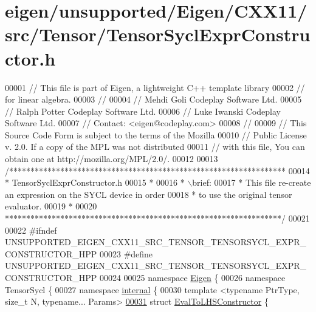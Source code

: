 \hypertarget{eigen_2unsupported_2_eigen_2_c_x_x11_2src_2_tensor_2_tensor_sycl_expr_constructor_8h_source}{}\section{eigen/unsupported/\+Eigen/\+C\+X\+X11/src/\+Tensor/\+Tensor\+Sycl\+Expr\+Constructor.h}
\label{eigen_2unsupported_2_eigen_2_c_x_x11_2src_2_tensor_2_tensor_sycl_expr_constructor_8h_source}

\begin{DoxyCode}
00001 \textcolor{comment}{// This file is part of Eigen, a lightweight C++ template library}
00002 \textcolor{comment}{// for linear algebra.}
00003 \textcolor{comment}{//}
00004 \textcolor{comment}{// Mehdi Goli    Codeplay Software Ltd.}
00005 \textcolor{comment}{// Ralph Potter  Codeplay Software Ltd.}
00006 \textcolor{comment}{// Luke Iwanski  Codeplay Software Ltd.}
00007 \textcolor{comment}{// Contact: <eigen@codeplay.com>}
00008 \textcolor{comment}{//}
00009 \textcolor{comment}{// This Source Code Form is subject to the terms of the Mozilla}
00010 \textcolor{comment}{// Public License v. 2.0. If a copy of the MPL was not distributed}
00011 \textcolor{comment}{// with this file, You can obtain one at http://mozilla.org/MPL/2.0/.}
00012 
00013 \textcolor{comment}{/*****************************************************************}
00014 \textcolor{comment}{ * TensorSyclExprConstructor.h}
00015 \textcolor{comment}{ *}
00016 \textcolor{comment}{ * \(\backslash\)brief:}
00017 \textcolor{comment}{ *  This file re-create an expression on the SYCL device in order}
00018 \textcolor{comment}{ *  to use the original tensor evaluator.}
00019 \textcolor{comment}{ *}
00020 \textcolor{comment}{*****************************************************************/}
00021 
00022 \textcolor{preprocessor}{#ifndef UNSUPPORTED\_EIGEN\_CXX11\_SRC\_TENSOR\_TENSORSYCL\_EXPR\_CONSTRUCTOR\_HPP}
00023 \textcolor{preprocessor}{#define UNSUPPORTED\_EIGEN\_CXX11\_SRC\_TENSOR\_TENSORSYCL\_EXPR\_CONSTRUCTOR\_HPP}
00024 
00025 \textcolor{keyword}{namespace }\hyperlink{namespace_eigen}{Eigen} \{
00026 \textcolor{keyword}{namespace }TensorSycl \{
00027 \textcolor{keyword}{namespace }\hyperlink{namespaceinternal}{internal} \{
00030 \textcolor{keyword}{template} <\textcolor{keyword}{typename} PtrType, \textcolor{keywordtype}{size\_t} N, \textcolor{keyword}{typename}... Params>
\hyperlink{struct_eigen_1_1_tensor_sycl_1_1internal_1_1_eval_to_l_h_s_constructor}{00031} \textcolor{keyword}{struct }\hyperlink{struct_eigen_1_1_tensor_sycl_1_1internal_1_1_eval_to_l_h_s_constructor}{EvalToLHSConstructor} \{

\end{DoxyCode}
